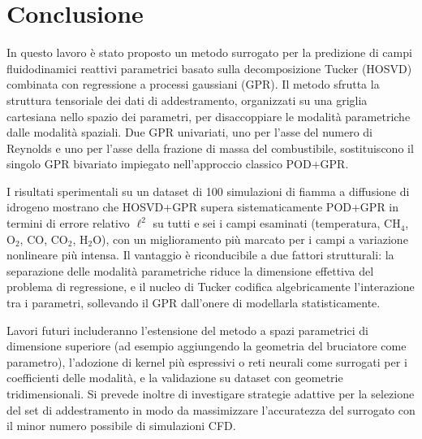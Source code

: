 \section{Conclusione}

In questo lavoro è stato proposto un metodo surrogato per la predizione di campi fluidodinamici reattivi parametrici basato sulla decomposizione Tucker (HOSVD) combinata con regressione a processi gaussiani (GPR). Il metodo sfrutta la struttura tensoriale dei dati di addestramento, organizzati su una griglia cartesiana nello spazio dei parametri, per disaccoppiare le modalità parametriche dalle modalità spaziali. Due GPR univariati, uno per l'asse del numero di Reynolds e uno per l'asse della frazione di massa del combustibile, sostituiscono il singolo GPR bivariato impiegato nell'approccio classico POD+GPR.

I risultati sperimentali su un dataset di 100 simulazioni di fiamma a diffusione di idrogeno mostrano che HOSVD+GPR supera sistematicamente POD+GPR in termini di errore relativo $\ell^2$ su tutti e sei i campi esaminati (temperatura, $\mathrm{CH_4}$, $\mathrm{O_2}$, $\mathrm{CO}$, $\mathrm{CO_2}$, $\mathrm{H_2O}$), con un miglioramento più marcato per i campi a variazione nonlineare più intensa. Il vantaggio è riconducibile a due fattori strutturali: la separazione delle modalità parametriche riduce la dimensione effettiva del problema di regressione, e il nucleo di Tucker codifica algebricamente l'interazione tra i parametri, sollevando il GPR dall'onere di modellarla statisticamente.

Lavori futuri includeranno l'estensione del metodo a spazi parametrici di dimensione superiore (ad esempio aggiungendo la geometria del bruciatore come parametro), l'adozione di kernel più espressivi o reti neurali come surrogati per i coefficienti delle modalità, e la validazione su dataset con geometrie tridimensionali. Si prevede inoltre di investigare strategie adattive per la selezione del set di addestramento in modo da massimizzare l'accuratezza del surrogato con il minor numero possibile di simulazioni CFD.
